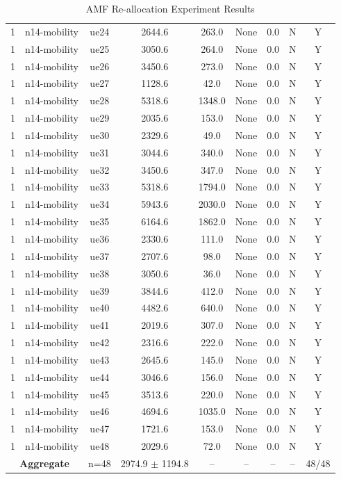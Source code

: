 \begin{table}[ht]
\begin{tabular}{|c|c|c|c|c|c|c|c|c|}
1 & n14-mobility & ue24 & 2644.6 & 263.0 & None & 0.0 & N & Y \\
1 & n14-mobility & ue25 & 3050.6 & 264.0 & None & 0.0 & N & Y \\
1 & n14-mobility & ue26 & 3450.6 & 273.0 & None & 0.0 & N & Y \\
1 & n14-mobility & ue27 & 1128.6 & 42.0 & None & 0.0 & N & Y \\
1 & n14-mobility & ue28 & 5318.6 & 1348.0 & None & 0.0 & N & Y \\
1 & n14-mobility & ue29 & 2035.6 & 153.0 & None & 0.0 & N & Y \\
1 & n14-mobility & ue30 & 2329.6 & 49.0 & None & 0.0 & N & Y \\
1 & n14-mobility & ue31 & 3044.6 & 340.0 & None & 0.0 & N & Y \\
1 & n14-mobility & ue32 & 3450.6 & 347.0 & None & 0.0 & N & Y \\
1 & n14-mobility & ue33 & 5318.6 & 1794.0 & None & 0.0 & N & Y \\
1 & n14-mobility & ue34 & 5943.6 & 2030.0 & None & 0.0 & N & Y \\
1 & n14-mobility & ue35 & 6164.6 & 1862.0 & None & 0.0 & N & Y \\
1 & n14-mobility & ue36 & 2330.6 & 111.0 & None & 0.0 & N & Y \\
1 & n14-mobility & ue37 & 2707.6 & 98.0 & None & 0.0 & N & Y \\
1 & n14-mobility & ue38 & 3050.6 & 36.0 & None & 0.0 & N & Y \\
1 & n14-mobility & ue39 & 3844.6 & 412.0 & None & 0.0 & N & Y \\
1 & n14-mobility & ue40 & 4482.6 & 640.0 & None & 0.0 & N & Y \\
1 & n14-mobility & ue41 & 2019.6 & 307.0 & None & 0.0 & N & Y \\
1 & n14-mobility & ue42 & 2316.6 & 222.0 & None & 0.0 & N & Y \\
1 & n14-mobility & ue43 & 2645.6 & 145.0 & None & 0.0 & N & Y \\
1 & n14-mobility & ue44 & 3046.6 & 156.0 & None & 0.0 & N & Y \\
1 & n14-mobility & ue45 & 3513.6 & 220.0 & None & 0.0 & N & Y \\
1 & n14-mobility & ue46 & 4694.6 & 1035.0 & None & 0.0 & N & Y \\
1 & n14-mobility & ue47 & 1721.6 & 153.0 & None & 0.0 & N & Y \\
1 & n14-mobility & ue48 & 2029.6 & 72.0 & None & 0.0 & N & Y \\
\multicolumn{2}{|c|}{\textbf{Aggregate}} & n=48 & 2974.9 $\pm$ 1194.8 & -- & -- & -- & -- & 48/48 \\
\hline
\end{tabular}
\caption{AMF Re-allocation Experiment Results}
\label{tab:amf_realloc}
\end{table}
